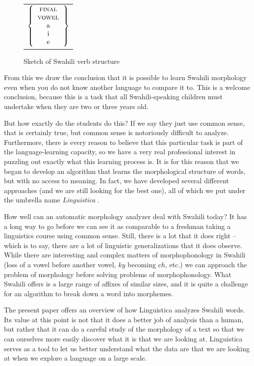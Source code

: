 \documentclass[output=paper,colorlinks,citecolor=brown]{langscibook}
\begin{document}
\begin{figure}
\begin{sideways}
\begin{tabular}{l}
$\left\{ \begin{tabular}{c} \textsc{final}\\ \textsc{vowel}\\a\\i\\e  \end{tabular}  \right\}$

\end{tabular}
\end{sideways}
\caption{Sketch of Swahili verb structure}
\label{sketch1}
\end{figure}
 
From this we draw the conclusion that it is possible to learn Swahili morphology even when you do not know another language to compare it to. This is a welcome conclusion, because this is a task that all Swahili-speaking children must undertake when they are two or three years old. 

But how exactly do the students do this? If we say they just use common sense, that is certainly true, but common sense is notoriously difficult to analyze. Furthermore, there is every reason to believe that this particular task is part of the language-learning capacity, so we have a very real professional interest in puzzling out exactly what this learning process is. It is for this reason that we began to develop an algorithm that learns the morphological structure of words, but with no access to meaning. In fact, we have developed several different approaches (and we are still looking for the best one), all of which we put under the umbrella name \textit{Linguistica} \citep{Goldsmith2001,Goldsmith2006,Goldsmith2010}.

How well can an automatic morphology analyzer deal with Swahili today? It has a long way to go before we can see it as comparable to a freshman taking a linguistics course using common sense. Still, there is a lot that it does right -- which is to say, there are a lot of linguistic generalizations that it does observe. While there are interesting and complex matters of morphophonology in Swahili (loss of a vowel before another vowel, $ky$ becoming $ch$, etc.) we can approach the problem of morphology before solving problems of morphophonology. What Swahili offers is a large range of affixes of similar sizes, and it is quite a challenge for an algorithm to break down a word into morphemes.

The present paper offers an overview of how Linguistica analyzes Swahili words. Its value at this point is not that it does a better job of analysis than a human, but rather that it can do a careful study of the morphology of a text so that we can ourselves more easily discover what it is that we are looking at. Linguistica serves as a tool to let us better understand what the data are that we are looking at when we explore a language on a large scale.
\end{document}
